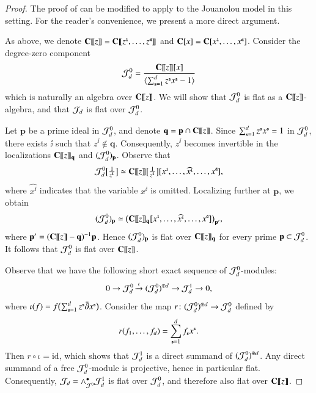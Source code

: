 \documentclass[main.tex]{subfiles}
\begin{document}
\begin{proof}
  The proof of \cite{FGY} can be modified to apply to the Jouanolou model in this setting. For the reader’s convenience, we present a more direct argument.

  As above, we denote $\mathbf{C}\llbracket z \rrbracket = \mathbf{C}\llbracket z^{\textbf{\texttt{\tiny{1}}}}, \ldots, z^{\textbf{\texttt{\tiny{d}}}} \rrbracket$ and $\mathbf{C}[x] = \mathbf{C}[x^{\textbf{\texttt{\tiny{1}}}},
\ldots,x^{\textbf{\texttt{\tiny{d}}}}]$.
Consider the degree-zero component
\[
\mathcal J_d^0=\frac{\mathbf{C}\llbracket z\rrbracket[x]}{\langle\sum_{\textbf{\texttt{\tiny{s}}}=1}^d z^{\textbf{\texttt{\tiny{s}}}}x^{\textbf{\texttt{\tiny{s}}}}
-1\rangle}
\]
which is naturally an algebra over $\mathbf{C}\llbracket z \rrbracket$. We will show that $\mathcal J_d^0$ is flat as a $\mathbf{C}\llbracket z\rrbracket$-algebra, and that $\mathcal J_d$ is flat over $\mathcal J_d^0$.

Let $\mathbf{p}$ be a prime ideal in $\mathcal J_d^0$, and denote $\mathbf{q}=\mathbf{p}\cap \mathbf{C}\llbracket z \rrbracket$. Since $\sum_{\textbf{\texttt{\tiny{s}}}=1}^d z^{\textbf{\texttt{\tiny{s}}}}x^{\textbf{\texttt{\tiny{s}}}}=1$ in $\mathcal J_d^0$, there exists $\ii$ such that $z^{\ii}\notin \mathbf{q}$. Consequently, $z^{\ii}$ becomes invertible in the localizations $\mathbf{C}\llbracket z \rrbracket_{\mathbf{q}}$ and $(\mathcal J_d^0)_{\mathbf{p}}$. Observe that
\[
\mathcal J_d^0\big[\tfrac{1}{z^{\textbf{\texttt{\tiny{i}}}}}\big]\simeq
\mathbf{C}\llbracket z \rrbracket\big[\tfrac{1}{z^{\textbf{\texttt{\tiny{i}}}}}\big][x^{{\textbf{\texttt{\tiny{1}}}}},\dots,\widehat{x^{\textbf{\texttt{\tiny{i}}}}},\dots,x^{\textbf{\texttt{\tiny{d}}}}],
\]
where $\widehat{x^{\ii}}$ indicates that the variable $x^{\ii}$ is omitted. Localizing further at $\mathbf{p}$, we obtain
\[
(\mathcal J_d^0)_{\mathbf{p}}\simeq
\big(\mathbf{C}\llbracket z \rrbracket_{\mathbf{q}}[x^{{\textbf{\texttt{\tiny{1}}}}},\dots,\widehat{x^{\textbf{\texttt{\tiny{i}}}}},\dots,x^{\textbf{\texttt{\tiny{d}}}}]\big)_{\mathbf{p}'},
\]
where $\mathbf{p}'=(\mathbf{C}\llbracket z \rrbracket-\mathbf{q})^{-1}\mathbf{p}$. Hence $(\mathcal J_d^0)_{\mathbf{p}}$ is flat over $\mathbf{C}\llbracket z \rrbracket_{\mathbf{q}}$ for every prime $\mathbf{p}\subset \mathcal J_d^0$. It follows that $\mathcal J_d^0$ is flat over $\mathbf{C}\llbracket z \rrbracket$.

Observe that we have the following short exact sequence of $\mathcal J^0_d$-modules:
\[
0\rightarrow \mathcal J^0_d\xrightarrow{\iota} (\mathcal J^0_d)^{\oplus d}\rightarrow \mathcal J^1_d\rightarrow 0,
\]
where $\iota(f)=f\bigl(\sum_{\textbf{\texttt{\tiny{s}}}=1}^d z^{\textbf{\texttt{\tiny{s}}}}\bar{\partial}x^{\textbf{\texttt{\tiny{s}}}}\bigr)$. Consider the map $r\colon (\mathcal J^0_d)^{\oplus d}\rightarrow \mathcal J^0_d$ defined by
\[
r(f_1,\dots,f_d)=\sum_{\textbf{\texttt{\tiny{s}}}=1}^d f_{\textbf{\texttt{\tiny{s}}}}x^{\textbf{\texttt{\tiny{s}}}}.
\]
Then $r\circ \iota=\mathrm{id}$, which shows that $\mathcal J^1_d$ is a direct summand of $(\mathcal J^0_d)^{\oplus d}$. Any
direct summand of a free $\mathcal J^0_d$-module is projective, hence in particular flat. Consequently, $\mathcal J_d=\wedge^\bullet_{\mathcal J^0}\mathcal J^1_d$ is flat over $\mathcal J^0_d$, and therefore also flat over $\mathbf{C}\llbracket z \rrbracket$.
\end{proof}
\end{document}
